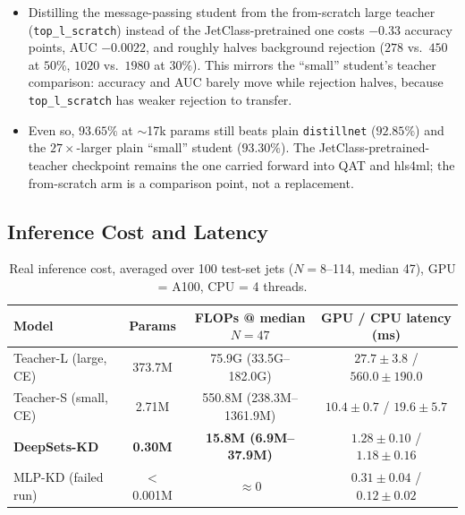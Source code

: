\begin{itemize}
    \item Distilling the message-passing student from the from-scratch large
    teacher (\texttt{top\_l\_scratch}) instead of the JetClass-pretrained one
    costs $-0.33$ accuracy points, AUC $-0.0022$, and roughly halves
    background rejection ($278$ vs.\ $450$ at $50\%$, $1020$ vs.\ $1980$ at
    $30\%$). This mirrors the ``small'' student's teacher comparison: accuracy
    and AUC barely move while rejection halves, because \texttt{top\_l\_scratch}
    has weaker rejection to transfer.
    \item Even so, $93.65\%$ at $\sim$17k params still beats plain
    \texttt{distillnet} ($92.85\%$) and the $27\times$-larger plain ``small''
    student ($93.30\%$). The JetClass-pretrained-teacher checkpoint remains
    the one carried forward into QAT and hls4ml; the from-scratch arm is a
    comparison point, not a replacement.
\end{itemize}

\subsection{Inference Cost and Latency}
\label{sec:inference-cost}

\begin{table}[h]
    \centering
    \small
    \begin{tabular}{lccc}
        \toprule
        Model & Params & FLOPs @ median $N{=}47$ & GPU / CPU latency (ms) \\
        \midrule
        Teacher-L (large, CE)  & 373.7M & 75.9G (33.5G--182.0G)   & $27.7\pm3.8$ / $560.0\pm190.0$ \\
        Teacher-S (small, CE)  & 2.71M  & 550.8M (238.3M--1361.9M) & $10.4\pm0.7$ / $19.6\pm5.7$ \\
        \textbf{DeepSets-KD}   & \textbf{0.30M} & \textbf{15.8M (6.9M--37.9M)} & $\mathbf{1.28\pm0.10}$ / $\mathbf{1.18\pm0.16}$ \\
        MLP-KD (failed run)    & $<$0.001M & $\approx$0 & $0.31\pm0.04$ / $0.12\pm0.02$ \\
        \bottomrule
    \end{tabular}
    \caption{Real inference cost, averaged over 100 test-set jets ($N=8$--114,
    median 47), GPU = A100, CPU = 4 threads.}
    \label{tab:inference-cost}
\end{table}

